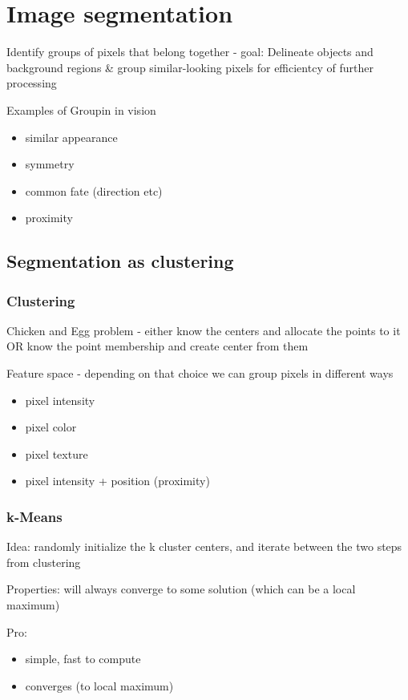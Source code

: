 \section{Image segmentation}
Identify groups of pixels that belong together - goal: Delineate objects and background regions \& group similar-looking pixels for efficientcy of further processing

Examples of Groupin in vision
\begin{itemize}
	\item similar appearance
	\item symmetry
	\item common fate (direction etc)
	\item proximity
\end{itemize}

\subsection{Segmentation as clustering}
\subsubsection{Clustering}
Chicken and Egg problem  - either know the centers and allocate the points to it OR know the point membership and create center from them

Feature space - depending on that choice we can group pixels in different ways

\begin{itemize}
	\item pixel intensity
	\item pixel color
	\item pixel texture
	\item pixel intensity + position (proximity)
\end{itemize}

\subsubsection{k-Means}
Idea: randomly initialize the k cluster centers, and iterate between the two steps from clustering

Properties: will always converge to some solution (which can be a local maximum)

Pro:
\begin{itemize}
	\item simple, fast to compute
	\item converges (to local maximum)
\end{itemize}

